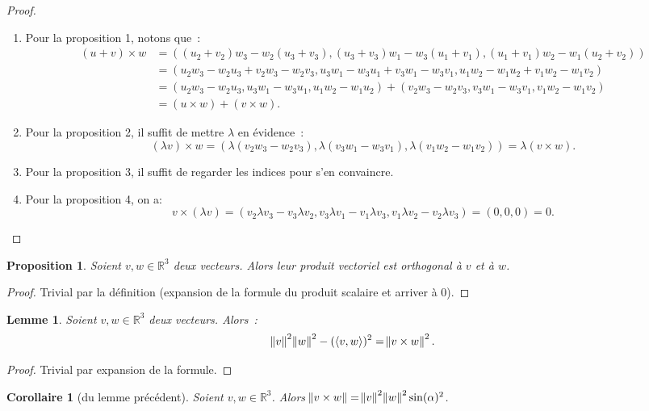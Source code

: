 \documentclass{article}
\newcommand{\R}{\mathbb R}
\newcommand{\scpr}[2]{\left\langle #1, #2\right\rangle}
\newtheorem{prp}[thm]{Proposition}
\newtheorem{cor}[thm]{Corollaire}
\newtheorem{lem}[thm]{Lemme}
\theoremstyle{definition}
\theoremstyle{remark}
\begin{document}
		\begin{proof}~
		\begin{enumerate}
			\item Pour la proposition 1, notons que~:
			      \begin{align*}(u+v) \times w &= ((u_2+v_2)w_3 - w_2(u_3+v_3), (u_3+v_3)w_1 - w_3(u_1+v_1), (u_1+v_1)w_2 - w_1(u_2+v_2)) \\
			      	&= (u_2w_3-w_2u_3 + v_2w_3-w_2v_3, u_3w_1-w_3u_1 + v_3w_1-w_3v_1, u_1w_2-w_1u_2 + v_1w_2-w_1v_2) \\
			      	&= (u_2w_3-w_2u_3, u_3w_1-w_3u_1, u_1w_2-w_1u_2) + (v_2w_3-w_2v_3, v_3w_1-w_3v_1, v_1w_2-w_1v_2) \\
			      	&= (u \times w) + (v \times w).
			      \end{align*}
			\item Pour la proposition 2, il suffit de mettre $\lambda$ en évidence~:
			      \[(\lambda v) \times w = (\lambda(v_2w_3-w_2v_3), \lambda(v_3w_1-w_3v_1), \lambda(v_1w_2-w_1v_2)) = \lambda(v \times w).\]
			\item Pour la proposition 3, il suffit de regarder les indices pour s'en convaincre.
			\item Pour la proposition 4, on a:
			      \[v \times (\lambda v) = (v_2\lambda v_3-v_3\lambda v_2, v_3\lambda v_1-v_1\lambda v_3, v_1\lambda v_2-v_2\lambda v_3) = (0, 0, 0) = 0.\]
		\end{enumerate}
		\end{proof}

		\begin{prp} Soient $v, w \in \R^3$ deux vecteurs. Alors leur produit vectoriel est orthogonal à $v$ et à $w$. \end{prp}

		\begin{proof} Trivial par la définition (expansion de la formule du produit scalaire et arriver à 0). \end{proof}

		\begin{lem}\label{prodsVecSc} Soient $v, w \in \R^3$ deux vecteurs. Alors~:\[\norm v^2\norm w^2 - (\scpr vw)^2 = \norm{v \times w}^2.\] \end{lem}
		
		\begin{proof} Trivial par expansion de la formule. \end{proof}

		\begin{cor}[du lemme précédent] Soient $v, w \in \R^3$. Alors $\norm {v \times w} = \norm v^2\norm w^2\sin(\alpha)^2$. \end{cor}
\end{document}
